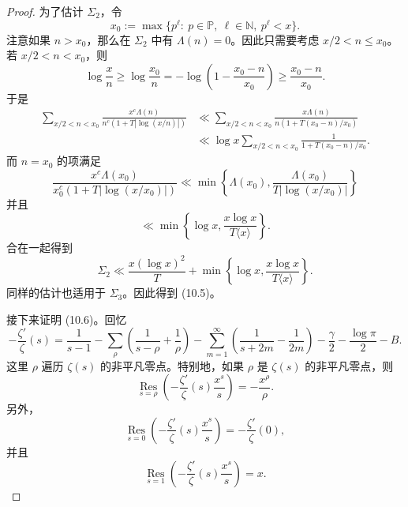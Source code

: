 \begin{proof}
	为了估计 $\Sigma_2$，令
	\[
		x_0:=\max\{p^\ell:\ p\in\mathbb P,\ \ell\in\mathbb N,\ p^\ell<x\}.
	\]
	注意如果 $n>x_0$，那么在 $\Sigma_2$ 中有 $\Lambda(n)=0$。因此只需要考虑
	$x/2<n\leq x_0$。
	若 $x/2<n<x_0$，则
	\[
		\log\frac{x}{n}
		\geq
		\log\frac{x_0}{n}
		=
		-\log\left(1-\frac{x_0-n}{x_0}\right)
		\geq
		\frac{x_0-n}{x_0}.
	\]
	于是
	\[
	\begin{aligned}
		\sum_{x/2<n<x_0}
		\frac{x^c\Lambda(n)}{n^c(1+T|\log(x/n)|)}
		&\ll
		\sum_{x/2<n<x_0}
		\frac{x\Lambda(n)}{n(1+T(x_0-n)/x_0)} \\
		&\ll
		\log x
		\sum_{x/2<n<x_0}
		\frac1{1+T(x_0-n)/x_0}.
	\end{aligned}
	\]
	而 $n=x_0$ 的项满足
	\[
		\frac{x^c\Lambda(x_0)}{x_0^c(1+T|\log(x/x_0)|)}
		\ll
		\min\left\{\Lambda(x_0),\frac{\Lambda(x_0)}{T|\log(x/x_0)|}\right\}
	\]
	并且
	\[
		\ll
		\min\left\{
			\log x,
			\frac{x\log x}{T\langle x\rangle}
		\right\}.
	\]
	合在一起得到
	\[
		\Sigma_2
		\ll
		\frac{x(\log x)^2}{T}
		+
		\min\left\{
			\log x,
			\frac{x\log x}{T\langle x\rangle}
		\right\}.
	\]
	同样的估计也适用于 $\Sigma_3$。因此得到 (10.5)。

	接下来证明 (10.6)。回忆
	\[
		-\frac{\zeta'}{\zeta}(s)
		=
		\frac1{s-1}
		-
		\sum_\rho
		\left(\frac1{s-\rho}+\frac1{\rho}\right)
		-
		\sum_{m=1}^{\infty}
		\left(\frac1{s+2m}-\frac1{2m}\right)
		-
		\frac{\gamma}{2}
		-
		\frac{\log\pi}{2}
		-
		B.
	\]
	这里 $\rho$ 遍历 $\zeta(s)$ 的非平凡零点。特别地，如果
	$\rho$ 是 $\zeta(s)$ 的非平凡零点，则
	\[
		\operatorname*{Res}_{s=\rho}
		\left(
			-\frac{\zeta'}{\zeta}(s)\frac{x^s}{s}
		\right)
		=
		-\frac{x^\rho}{\rho}.
	\]
	另外，
	\[
		\operatorname*{Res}_{s=0}
		\left(
			-\frac{\zeta'}{\zeta}(s)\frac{x^s}{s}
		\right)
		=
		-\frac{\zeta'}{\zeta}(0),
	\]
	并且
	\[
		\operatorname*{Res}_{s=1}
		\left(
			-\frac{\zeta'}{\zeta}(s)\frac{x^s}{s}
		\right)
		=
		x.
	\]


\end{proof}
